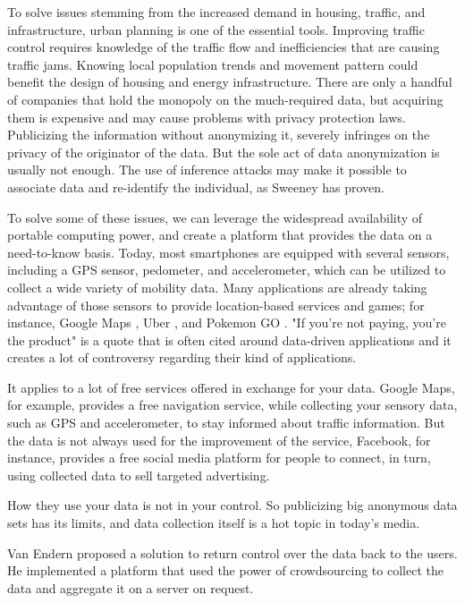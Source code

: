 To solve issues stemming from the increased demand in housing, traffic, and infrastructure, urban planning is one of the essential tools. Improving traffic control requires knowledge of the traffic flow and inefficiencies that are causing traffic jams. Knowing local population trends and movement pattern could benefit the design of housing and energy infrastructure. There are only a handful of companies that hold the monopoly on the much-required data, but acquiring them is expensive and may cause problems with privacy protection laws. Publicizing the information without anonymizing it, severely infringes on the privacy of the originator of the data. But the sole act of data anonymization is usually not enough. The use of inference attacks may make it possible to associate data and re-identify the individual, as Sweeney \cite{DBLP:journals/ijufks/Sweene02} has proven.

To solve some of these issues, we can leverage the widespread availability of portable computing power, and create a platform that provides the data on a need-to-know basis. Today, most smartphones are equipped with several sensors, including a GPS sensor, pedometer, and accelerometer, which can be utilized to collect a wide variety of mobility data. Many applications are already taking advantage of those sensors to provide location-based services and games; for instance, Google Maps \cite{maps}, Uber \cite{uber}, and Pokemon GO \cite{pokemon}. "If you're not paying, you're the product" is a quote that is often cited around data-driven applications \cite{newyorktimes}\cite{tedtalk}\cite{arstechnica} and it creates a lot of controversy regarding their kind of applications.

It applies to a lot of free services offered in exchange for your data. Google Maps, for example, provides a free navigation service, while collecting your sensory data, such as GPS and accelerometer, to stay informed about traffic information. But the data is not always used for the improvement of the service, Facebook, for instance, provides a free social media platform for people to connect, in turn, using collected data to sell targeted advertising.

How they use your data is not in your control. So publicizing big anonymous data sets has its limits, and data collection itself is a hot topic in today's media. 

Van Endern \cite{simon} proposed a solution to return control over the data back to the users. He implemented a platform that used the power of crowdsourcing to collect the data and aggregate it on a server on request.

